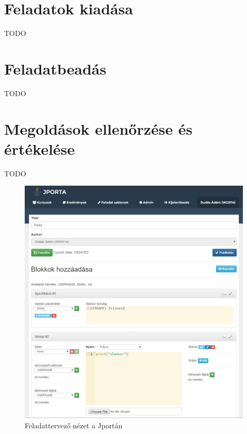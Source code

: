 \section{Feladatok kiadása}
TODO

\section{Feladatbeadás}
TODO

\section{Megoldások ellenőrzése és értékelése}\label{section:submission-evaluation}
TODO


\begin{figure}[h]
    \centering
    \includegraphics[width=\textwidth]{figures/jporta-exercise}
    \caption{Feladattervező nézet a Jportán}
    \label{figure:jporta-exercise}
\end{figure}

